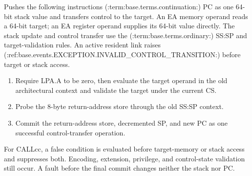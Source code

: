 Pushes the following instruction\textquotesingle{}s (:term:base.terms.continuation:) PC as one 64-bit stack value and transfers control to the target. An EA memory operand reads a 64-bit target; an EA register operand supplies its 64-bit value directly. The stack update and control transfer use the (:term:base.terms.ordinary:) SS:SP and target-validation rules. An active resident link raises (:ref:base.events.EXCEPTION.INVALID_CONTROL_TRANSITION:) before target or stack access.


\begin{enumerate}
\item Require LPA.A to be zero, then evaluate the target operand in the old architectural context and validate the target under the current CS.
\item Probe the 8-byte return-address store through the old SS:SP context.
\item Commit the return-address store, decremented SP, and new PC as one successful control-transfer operation.
\end{enumerate}

For CALLcc, a false condition is evaluated before target-memory or stack access and suppresses both. Encoding,
extension, privilege, and control-state validation still occur. A fault before the final commit changes neither the
stack nor PC.
